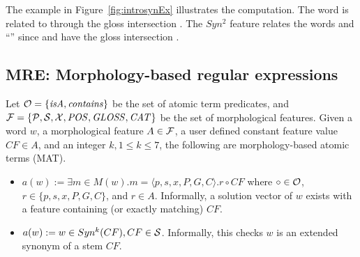 The example in Figure~\ref{fig:introsynEx} illustrates the computation. 
The word  is related to  through the gloss intersection . 
The $Syn^2$ feature relates 
the words  and ``'' since  and  
have the gloss intersection .



				  
\vspace{-3em}
\subsection{MRE: Morphology-based regular expressions}

Let ${\cal O} = \{ \mathit{isA}, \mathit{contains}\}$ be the set of atomic term 
predicates, and ${\cal F} = \{ \pp, \ss, \xx, \PP, \GG, \AC\}$ be the 
set of morphological features. 
Given a word $w$, a morphological feature $A\in{\cal F}$, 
a user defined constant feature value $CF\in A$, and an integer 
$k, 1\le k\le 7$, 
the following are morphology-based atomic terms (MAT). 
\begin{itemize}
  \item $a(w):= \exists m \in M(w). m=\langle p,s,x,P,G,C\rangle. r \circ CF$
where $\circ \in {\cal O}$, $r \in \{p,s,x,P,G,C\}$, and $r\in A$.
Informally, a solution vector of $w$ exists with
a feature containing (or exactly matching) $CF$. 
\item $a(w) := w \in Syn^k(CF), CF \in \ss$.
  Informally, this checks $w$ is an extended synonym of a stem $CF$. 
\end{itemize}
   

